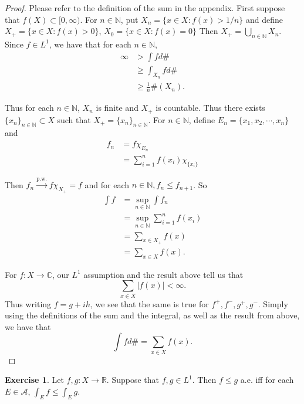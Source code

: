 \documentclass[12pt]{amsart}
\theoremstyle{definition}
\newtheorem{ex}[definition]{Exercise}
\newcommand{\C}{\mathbb{C}}
\newcommand{\N}{\mathbb{N}}
\newcommand{\R}{\mathbb{R}}
\newcommand{\MA}{\mathcal{A}}
\newcommand{\Rg}{[0,\infty)}
\newcommand{\lex}[1]{\label{ex:#1}}
\begin{document}
	\begin{proof} Please refer to the definition of the sum in the appendix. First suppose that $f(X) \subset \Rg$. For $n \in \N$, put $X_n = \{x \in X: f(x) > 1/n\}$ and define $X_+ = \{x \in X: f(x) > 0\}$, $X_0 = \{x \in X: f(x) = 0\}$ Then $X_+ = \bigcup\limits_{n \in \N}X_n$. Since $f \in L^1$, we have that for each $n \in \N$,
		\begin{align*}
			\infty 
			&> \int f d\#\\
			&\geq \int_{X_n} f d\# \\
			&\geq \frac{1}{n} \#(X_n).
		\end{align*}
		
		Thus for each $n \in \N$, $X_n$ is finite and $X_+$ is countable. Thus there exists $\{x_n\}_{n \in \N} \subset X$ such that $X_+ = \{x_n\}_{n \in \N}$. For $n \in \N$, define $E_n = \{x_1, x_2, \cdots, x_n\}$ and 
		\begin{align*}
			f_n 
			&= f \chi_{E_n}\\
			&= \sum_{i = 1}^n f(x_i)\chi_{\{x_i\}}
		\end{align*}
		
		Then $f_n \xrightarrow{\text{p.w.}} f\chi_{X_+} = f$ and for each $n \in \N, f_n \leq f_{n+1}$. So
		\begin{align*}
			\int f 
			&= \sup_{n \in \N} \int f_n\\
			&= \sup_{n \in \N} \sum_{i =1}^n f(x_i)\\
			&= \sum_{x \in X_+} f(x)\\
			&=\sum_{x \in X} f(x).
		\end{align*} 
		
		For $f:X \rightarrow \C$, our $L^1$ assumption and the result above tell us that $$\sum_{x \in X}|f(x)| < \infty.$$ Thus writing $f = g+ih$, we see that the same is true for $f^+,f^-,g^+,g^-$. Simply using the definitions of the sum and the integral, as well as the result from above, we have that $$\int fd\# = \sum_{x \in X}f(x).$$
	\end{proof}
	
	\begin{ex} \lex{00000} 
		Let $f,g:X \rightarrow \R$. Suppose that $f,g \in L^1$. Then $f \leq g$ a.e. iff for each $E \in \MA$, $\int_E f \leq \int_E g$.  
	\end{ex}
	
\end{document}
